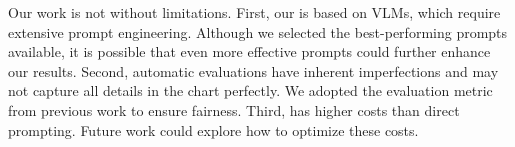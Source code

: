 Our work is not without limitations. First, our \model{} is based on VLMs, which require extensive prompt engineering. Although we selected the best-performing prompts available, it is possible that even more effective prompts could further enhance our results. Second, automatic evaluations have inherent imperfections and may not capture all details in the chart perfectly. We adopted the evaluation metric from previous work to ensure fairness. Third, \model{} has higher costs than direct prompting. Future work could explore how to optimize these costs.